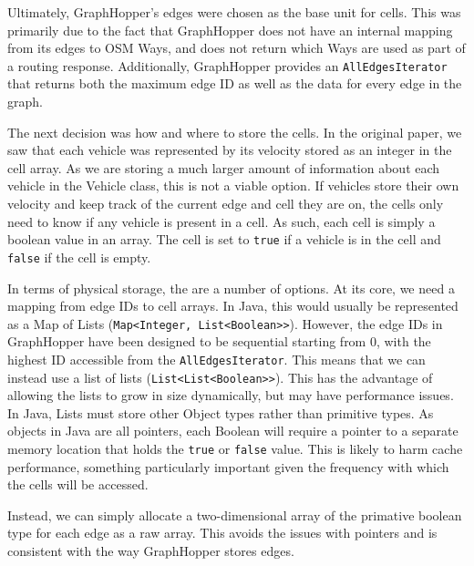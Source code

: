 \documentclass[ %
                    author={Alexander Hill},
                supervisor={Dr. Benjamin Sach},
                    degree={MEng},
                     title={MARMOSET},
                  subtitle={Multi-Agent Route Management using Online Simulation for Efficient Transportation},
                      type={research},
                      year={2016} ]{dissertation}
\begin{document}
Ultimately, GraphHopper's edges were chosen as the base unit for cells. This was
primarily due to the fact that GraphHopper does not have an internal mapping
from its edges to OSM Ways, and does not return which Ways are used as part of a
routing response. Additionally, GraphHopper provides an
\texttt{AllEdgesIterator} that returns both the maximum edge ID as well as the
data for every edge in the graph.

The next decision was how and where to store the cells. In the original paper, we
saw that each vehicle was represented by its velocity stored as an integer in
the cell array. As we are storing a much larger amount of information about each
vehicle in the Vehicle class, this is not a viable option. If vehicles store
their own velocity and keep track of the current edge and cell they are on, the
cells only need to know if any vehicle is present in a cell. As such, each cell
is simply a boolean value in an array. The cell is set to \texttt{true} if a
vehicle is in the cell and \texttt{false} if the cell is empty.

In terms of physical storage, the are a number of options. At its core, we need
a mapping from edge IDs to cell arrays. In Java, this would usually be
represented as a Map of Lists (\texttt{Map<Integer, List<Boolean>>}). However,
the edge IDs in GraphHopper have been designed to be sequential starting from 0,
with the highest ID accessible from the \texttt{AllEdgesIterator}. This means
that we can instead use a list of lists (\texttt{List<List<Boolean>>}). This has
the advantage of allowing the lists to grow in size dynamically, but may have
performance issues. In Java, Lists must store other Object types rather than
primitive types. As objects in Java are all pointers, each Boolean will require
a pointer to a separate memory location that holds the \texttt{true} or
\texttt{false} value.  This is likely to harm cache performance, something
particularly important given the frequency with which the cells will be
accessed.

Instead, we can simply allocate a two-dimensional array of the primative boolean
type for each edge as a raw array. This avoids the issues with pointers and is
consistent with the way GraphHopper stores edges.
\end{document}
